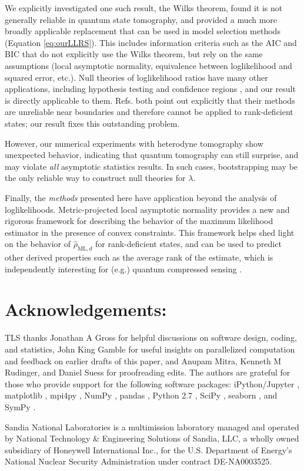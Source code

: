 \documentclass[aps,pra, twocolumn]{revtex4-1}
\newcommand{\rhohat}{\hat{\rho}}
\newcommand{\rhoML}[1]{\rhohat_{\scriptscriptstyle{\mathrm{ML},#1}}}
\begin{document}
We explicitly investigated one such result, the Wilks theorem, found it is not generally reliable in quantum state tomography, and provided  a much more broadly applicable replacement that can be used in model selection methods (Equation \eqref{eq:ourLLRS}).  This includes information criteria such as the AIC and BIC \cite{Akaike1974, Schwarz1978, Kass1995, Burnham2004} that do not explicitly use the Wilks theorem, but rely on the same assumptions (local asymptotic normality, equivalence between loglikelihood and squared error, etc.).  Null theories of loglikelihood ratios have many other applications, including hypothesis testing \cite{Blume-Kohout2010,Moroder2013} and confidence regions \cite{Glancy2012a}, and our result is directly applicable to them.  Refs. \cite{Moroder2013,Glancy2012a} both point out explicitly that their methods are unreliable near boundaries and therefore cannot be applied to rank-deficient states; our result fixes this outstanding problem.

However, our numerical experiments with heterodyne tomography show unexpected behavior, indicating that quantum tomography can still surprise, and may violate \emph{all} asymptotic statistics results.  In such cases, bootstrapping \cite{Efron1979, Higgins2004} may be the only reliable way to construct null theories for $\lambda$. 

Finally, the \emph{methods} presented here have application beyond the analysis of loglikelihoods.  Metric-projected local asymptotic normality provides a new and rigorous framework for describing the behavior of the maximum likelihood estimator in the presence of convex constraints. This framework helps shed light on the behavior of $\rhoML{d}$ for rank-deficient states, and can be used to predict other derived properties such as the average rank of the estimate, which is independently interesting for (e.g.) quantum compressed sensing \cite{Flammia2012a, Steffens2016, Kalev2015, Kalev2015a}.

\section{Acknowledgements:}
TLS thanks Jonathan A Gross for helpful discussions on software design, coding, and statistics, John King Gamble for useful insights on parallelized
computation and feedback on earlier drafts of this paper, and Anupam Mitra, Kenneth M Rudinger, and Daniel Suess for proofreading edits. The authors are grateful for those who provide support for the following software packages: iPython/Jupyter \cite{Perez}, matplotlib
\cite{Hunter2007}, mpi4py \cite{Dalcin2011},  NumPy \cite{VanDerWalt2011}, pandas \cite{mckinney2010}, Python 2.7 
\cite{vanRossum}, SciPy \cite{Oliphant2007a}, seaborn \cite{Waskom2016}, and SymPy \cite{Meurer2017}. 

Sandia National Laboratories is a multimission laboratory managed and operated by National Technology \& Engineering Solutions of Sandia, LLC, a wholly owned subsidiary of Honeywell International Inc., for the U.S. Department of Energy's National Nuclear Security Administration under contract DE-NA0003525.



\end{document}
